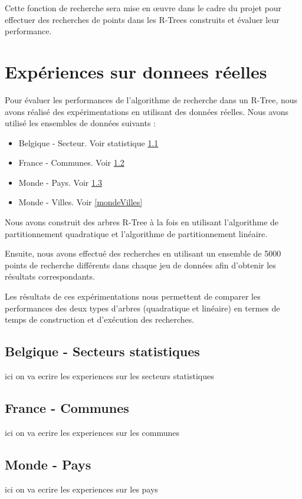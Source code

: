 \documentclass {article}
\begin{document}
Cette fonction de recherche sera mise en œuvre dans le cadre du projet pour effectuer des recherches 
de points dans les R-Trees construits et évaluer leur performance.



\section {Expériences sur donnees réelles}


Pour évaluer les performances de l'algorithme de recherche dans un R-Tree, 
nous avons réalisé des expérimentations en utilisant des données réelles. 
Nous avons utilisé les ensembles de données suivants :

\begin{itemize}

    \item Belgique - Secteur. Voir statistique \ref{belgique}
    \item France - Communes. Voir \ref{france}
    \item Monde - Pays. Voir \ref{mondePays}
    \item Monde - Villes. Voir \ref{mondeVilles}
\end{itemize}

Nous avons construit des arbres R-Tree à la fois en utilisant l'algorithme de partitionnement quadratique 
et l'algorithme de partitionnement linéaire.

Ensuite, nous avons effectué des recherches en utilisant un ensemble de 5000 points de recherche différents 
dans chaque jeu de données afin d'obtenir les résultats correspondants.

Les résultats de ces expérimentations nous permettent de comparer les performances des deux types d'arbres 
(quadratique et linéaire) en termes de temps de construction et d'exécution des recherches.


\subsection {Belgique - Secteurs statistiques}\label{belgique}
ici on va ecrire les experiences sur les secteurs statistiques

\subsection {France - Communes}\label{france}
ici on va ecrire les experiences sur les communes

\subsection {Monde - Pays}\label{mondePays}
ici on va ecrire les experiences sur les pays
\end{document}
